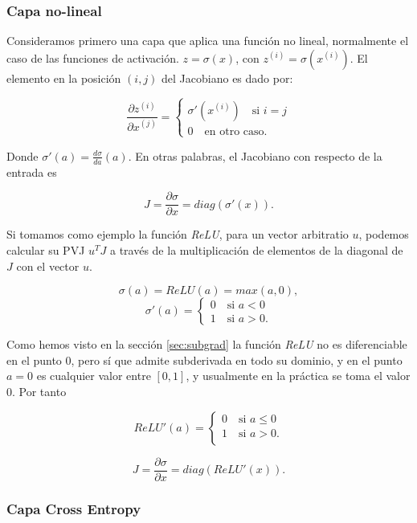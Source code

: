 \subsubsection{Capa no-lineal}



Consideramos primero una capa que aplica una función no lineal, normalmente el caso de las funciones de activación. $z=\sigma(x)$, con $z^{(i)} = \sigma(x^{(i)})$. El elemento en la posición $(i,j)$ del Jacobiano es dado por:

$$ \frac{\partial z^{(i)}}{\partial x^{(j)}} =  \left\{\begin{matrix}

\sigma'(x^{(i)}) \quad \textrm{si } i=j  \\
0 \quad \textrm{en otro caso.}
\end{matrix}\right .
$$

Donde $\sigma'(a) = \frac{d\sigma}{da}(a)$. En otras palabras, el Jacobiano con respecto de la entrada es 

$$J=\frac{\partial \sigma}{\partial x}= diag(\sigma'(x)).$$

Si tomamos como ejemplo la función \textit{ReLU}, para un vector arbitratio $u$, podemos calcular su PVJ $u^TJ$ a través de la multiplicación  de elementos de la diagonal de $J$ con el vector $u$. 


$$\sigma(a) = ReLU(a)= max(a,0),$$
$$\sigma'(a)=
\left\{\begin{matrix}

0 \quad \textrm{si } a<0  \\
1 \quad \textrm{si } a>0.
\end{matrix}\right.
$$

Como hemos visto en la sección \ref{sec:subgrad} la función \textit{ReLU} no es diferenciable en el punto 0, pero sí que admite subderivada en todo su dominio, y en el punto $a=0$ es cualquier valor entre $[0,1]$, y usualmente en la práctica se toma el valor 0. Por tanto

$$ReLU'(a)= \left\{\begin{matrix}

0 \quad \textrm{si } a\leq0  \\
1 \quad \textrm{si } a>0 \textrm{.} \\
\end{matrix} \right.$$

$$J=\frac{\partial \sigma}{\partial x}= diag(ReLU'(x)).$$


\subsubsection{Capa Cross Entropy}

